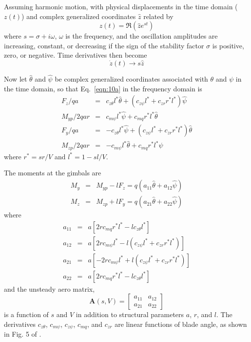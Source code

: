 \documentclass[11pt,openany,twoside]{book}
\numberwithin{equation}{section}		%
\newcommand{\Matrix}[1]{\boldsymbol{#1}}
\newcommand{\Eqn}[1]{Eq.\ \ref{#1}}  %
\begin{document}
Assuming harmonic motion, with physical displacements in the time domain ($z(t)$)
and complex generalized coordinates $\hat{z}$ related by
\begin{equation}
z(t) = \Re\left(\hat{z}e^{st}\right)
\end{equation}
where $s = \sigma + i\omega$, $\omega$ is the frequency, and the
oscillation amplitudes are increasing, constant, or decreasing if the
sign of the stability factor $\sigma$ is positive, zero, or negative.
Time derivatives then become
\begin{equation}
\dot{z}(t) \rightarrow s\hat{z}
\end{equation}

Now let $\hat{\theta}$ and $\hat{\psi}$ be complex generalized coordinates associated with
$\theta$ and $\psi$ in the time domain, so that \Eqn{eqn:10a} in the frequency
domain is
\begin{eqnarray}
\label{eqn:10b}
F_z/qa &=& c_{z\theta}l^*\hat{\theta} + \left( c_{z\psi}l^* + c_{zr}r^*l^*\right)\hat{\psi} \nonumber \\
M_{yp}/2qar &=& c_{m\psi}l^*\hat{\psi} + c_{mq}r^*l^*\hat{\theta} \nonumber \\
F_y/qa &=& -c_{z\theta}l^*\hat{\psi} + \left(c_{z\psi}l^* + c_{zr}r^*l^*\right)\hat{\theta} \nonumber \\
M_{zp}/2qar &=& -c_{m\psi}l^*\hat{\theta} + c_{mq}r^*l^*\hat{\psi}
\end{eqnarray}
where $r^* = sr/V$ and $l^* = 1 - sl/V$.

The moments at the gimbals are
\begin{eqnarray}
M_y &=& M_{yp} - lF_z = q(a_{11}\hat{\theta} + a_{12}\hat{\psi}) \nonumber \\
M_z &=& M_{zp} + lF_y = q(a_{21}\hat{\theta} + a_{22}\hat{\psi})
\end{eqnarray}
where
\begin{eqnarray}
	a_{11} &=& a\left[2rc_{mq}r^*l^* - lc_{z\theta}l^*\right] \nonumber \\
	a_{12} &=& a\left[2rc_{m\psi}l^* - l\left(c_{z\psi}l^* + c_{zr}r^*l^*\right)\right] \nonumber \\
	a_{21} &=& a\left[-2rc_{m\psi}l^* + l\left(c_{z\psi}l^* + c_{zr}r^*l^*\right)\right] \nonumber \\
	a_{22} &=& a\left[2rc_{mq}r^*l^* - lc_{z\theta}l^*\right]
\end{eqnarray}
and the unsteady aero matrix,
\begin{equation}
\Matrix{A}(s,V) = \left[ \begin{array}{cc}
		a_{11}  &  a_{12} \\
		a_{21}  &  a_{22}
	\end{array} \right]
\end{equation}
is a function of $s$ and $V$ in addition to structural parameters $a$, $r$, and $l$.
The derivatives $c_{z\theta}$, $c_{m\psi}$, $c_{z\psi}$, $c_{mq}$, and $c_{zr}$
are linear functions of blade angle, as shown in Fig. 5 of \cite{reed1961analytical}.
\end{document}
